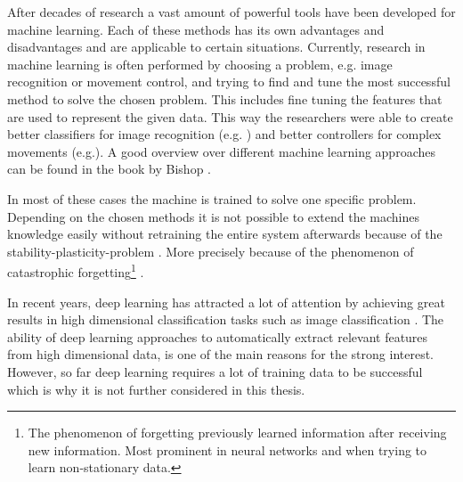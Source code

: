 After decades of research a vast amount of powerful tools have been developed for machine learning. Each of these methods has its own advantages and disadvantages and are applicable to certain situations. Currently, research in machine learning is often performed by choosing a problem, e.g. image recognition or movement control, and trying to find and tune the most successful method to solve the chosen problem. This includes fine tuning the features that are used to represent the given data. This way the researchers were able to create better classifiers for image recognition (e.g. \cite{imageRecList}) and better controllers for complex movements (e.g.\cite{movementList}). A good overview over different machine learning approaches can be found in the book by Bishop \cite{bishop2006pattern}.

In most of these cases the machine is trained to solve one specific problem. Depending on the chosen methods it is not possible to extend the machines knowledge easily without retraining the entire system afterwards because of the stability-plasticity-problem \cite{stability-plasticity}. More precisely because of the phenomenon of catastrophic forgetting\footnote{The phenomenon of forgetting previously learned information after receiving new information. Most prominent in neural networks and when trying to learn non-stationary data.} \cite{catastrophicForgetting1}.

In recent years, deep learning \cite{deepLearning2009,deepFrontier} has attracted a lot of attention by achieving great results in high dimensional classification tasks such as image classification \cite{deepImageClassification}. The ability of deep learning approaches to automatically extract relevant features from high dimensional data, is one of the main reasons for the strong interest. However, so far deep learning requires a lot of training data to be successful which is why it is not further considered in this thesis.

